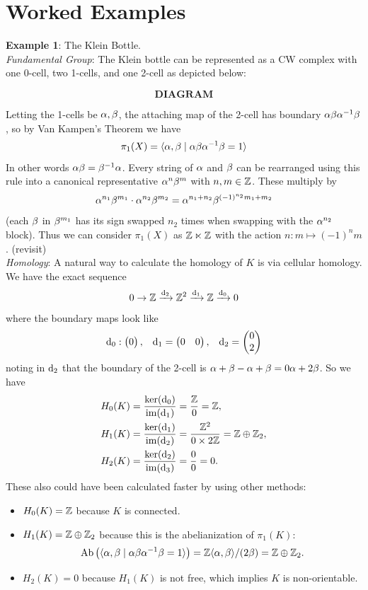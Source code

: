 \documentclass{amsart}
\begin{document}
	\newpage

	
	\section{Worked Examples} 
	
	\textbf{Example 1}: The Klein Bottle.\\
	
	\textit{Fundamental Group}: The Klein bottle can be represented as a CW complex with one 0-cell, two 1-cells, and one 2-cell as depicted below:
	
	$$\textbf{DIAGRAM}$$
	
	Letting the 1-cells be $\alpha,\beta$, the attaching map of the 2-cell has boundary $\alpha\beta\alpha^{-1}\beta$, so by Van Kampen's Theorem we have
	$$
	\pi_1(X) = \langle\alpha,\beta \; | \; \alpha\beta\alpha^{-1}\beta = 1\rangle
	$$
	In other words $\alpha\beta = \beta^{-1}\alpha$. Every string of $\alpha$ and $\beta$ can be rearranged using this rule into a canonical representative $\alpha^n\beta^m$ with $n,m\in \mathbb{Z}$. These multiply by
	$$
	\alpha^{n_1}\beta^{m_1} \cdot \alpha^{n_2}\beta^{m_2} = \alpha^{n_1+n_2}\beta^{(-1)^{n_2}m_1 + m_2}
	$$
	(each $\beta$ in $\beta^{m_1}$ has its sign swapped $n_2$ times when swapping with the $\alpha^{n_2}$ block). Thus we can consider $\pi_1(X)$ as $\mathbb{Z} \ltimes \mathbb{Z}$ with the action $n:m\mapsto (-1)^nm$. (revisit)\\
	
	\textit{Homology}: A natural way to calculate the homology of $K$ is via cellular homology. We have the exact sequence
	$$
	0 \to \mathbb{Z} \xrightarrow{\textrm{d}_2} \mathbb{Z}^2 \xrightarrow{\textrm{d}_1} \mathbb{Z}\xrightarrow{\textrm{d}_0} 0
	$$
	where the boundary maps look like 
	$$
	\textrm{d}_0 : \begin{pmatrix} 0 \end{pmatrix}, \;\;\; \textrm{d}_1 = \begin{pmatrix}0 & 0 \end{pmatrix},\;\;\; \textrm{d}_2 = \begin{pmatrix} 0 \\ 2 \end{pmatrix} 
	$$
	noting in $\textrm{d}_2$ that the boundary of the 2-cell is $\alpha + \beta - \alpha + \beta = 0\alpha + 2\beta$. So we have 
	\begin{align*}
	H_0(K) &= \frac{\ker(\textrm{d}_0)}{\operatorname{im}(\textrm{d}_1)} = \frac{\mathbb{Z}}{0} = \mathbb{Z},\\
	H_1(K) &= \frac{\ker(\textrm{d}_1)}{\operatorname{im}(\textrm{d}_2)} = \frac{\mathbb{Z}^2}{0\times 2\mathbb{Z}} = \mathbb{Z}\oplus \mathbb{Z}_2,\\
	H_2(K) &= \frac{\ker(\textrm{d}_2)}{\operatorname{im}(\textrm{d}_3)} = \frac{0}{0} = 0.
	\end{align*}
	These also could have been calculated faster by using other methods:
	\begin{itemize}
		\item $H_0(K)=\mathbb{Z}$ because $K$ is connected.
		\item $H_1(K)=\mathbb{Z}\oplus \mathbb{Z}_2$ because this is the abelianization of $\pi_1(K)$:
		$$
		\operatorname{Ab}\big(\langle\alpha,\beta\; | \; \alpha\beta\alpha^{-1}\beta = 1\rangle\big) = \mathbb{Z}\langle\alpha,\beta\rangle/(2\beta) = \mathbb{Z} \oplus \mathbb{Z}_2.   
		$$ 
		\item $H_2(K)=0$ because $H_1(K)$ is not free, which implies $K$ is non-orientable.\\
	\end{itemize}
	
\end{document}
